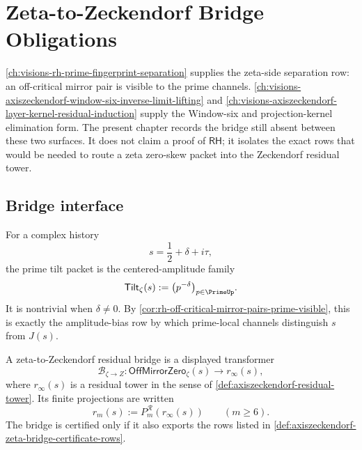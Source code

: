 \chapter{Zeta-to-Zeckendorf Bridge Obligations}
\label{ch:visions-axiszeckendorf-zeta-to-zeckendorf-bridge-obligations}

\autoref{ch:visions-rh-prime-fingerprint-separation} supplies the zeta-side
separation row: an off-critical mirror pair is visible to the prime channels.
\autoref{ch:visions-axiszeckendorf-window-six-inverse-limit-lifting} and
\autoref{ch:visions-axiszeckendorf-layer-kernel-residual-induction} supply
the Window-six and projection-kernel elimination form.  The present chapter
records the bridge still absent between these two surfaces.  It does not
claim a proof of $\mathsf{RH}$; it isolates the exact rows that would be
needed to route a zeta zero-skew packet into the Zeckendorf residual tower.

\section{Bridge interface}
\label{sec:axiszeckendorf-zeta-bridge-interface}

\begin{definition}
\label{def:axiszeckendorf-prime-tilt-packet}
For a complex history
$$
s=\frac{1}{2}+\delta+i\tau,
$$
the prime tilt packet is the centered-amplitude family
$$
\mathsf{Tilt}_{\zeta}(s)
:=
\bigl(p^{-\delta}\bigr)_{p\in\PrimeUp}.
$$
It is nontrivial when $\delta\neq0$.  By
\autoref{cor:rh-off-critical-mirror-pairs-prime-visible}, this is exactly
the amplitude-bias row by which prime-local channels distinguish $s$ from
$J(s)$.
\end{definition}

\begin{definition}
\label{def:axiszeckendorf-zeta-to-zeckendorf-residual-bridge}
A zeta-to-Zeckendorf residual bridge is a displayed transformer
$$
\mathcal B_{\zeta\to Z}:
\mathsf{OffMirrorZero}_{\zeta}(s)
\to
r_\infty(s),
$$
where $r_\infty(s)$ is a residual tower in the sense of
\autoref{def:axiszeckendorf-residual-tower}.  Its finite projections are
written
$$
r_m(s):=P_m^{\mathcal R}(r_\infty(s))
\qquad
(m\geq6).
$$
The bridge is certified only if it also exports the rows listed in
\autoref{def:axiszeckendorf-zeta-bridge-certificate-rows}.
\end{definition}

